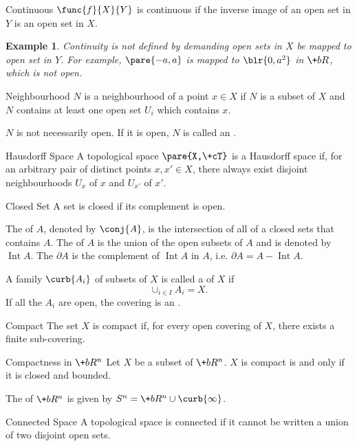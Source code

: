 \documentclass[hidelinks]{article}
\newtheorem{example}{Example}
\DeclareMathOperator{\Int}{Int}
\begin{document}
\begin{termdef}{Continuous}
    $\func{f}{X}{Y}$ is continuous if the inverse image of an open set in $Y$ is an open set in $X$.
\end{termdef}
\begin{sample}
    \begin{example}
        Continuity is not defined by demanding open sets in $X$ be mapped to open set in $Y$. For example, $\pare{-a,a}$ is mapped to $\blr{0,a^2}$ in $\+bR$, which is not open.
    \end{example}
\end{sample}
\begin{termdef}{Neighbourhood}
    $N$ is a neighbourhood of a point $x\in X$ if $N$ is a subset of $X$ and $N$ contains at least one open set $U_i$ which contains $x$.
\end{termdef}
$N$ is not necessarily open. If it is open, $N$ is called an .
\begin{termdef}{Hausdorff Space}
    A topological space $\pare{X,\+cT}$ is a Hausdorff space if, for an arbitrary pair of distinct points $x,x' \in X$, there always exist disjoint neighbourhoods $U_x$ of $x$ and $U_{x'}$ of $x'$.
\end{termdef}
\begin{termdef}{Closed Set}
    A set is closed if its complement is open.
\end{termdef}
The  of $A$, denoted by $\conj{A}$, is the intersection of all of a closed sets that contains $A$. The  of $A$ is the union of the open subsets of $A$ and is denoted by $\Int A$. The  $\partial A$ is the complement of $\Int A$ in $A$, i.e. $\partial A = A - \Int A$.
\par
A family $\curb{A_i}$ of subsets of $X$ is called a  of $X$ if
\[ \cup_{i\in I} A_i = X. \]
If all the $A_i$ are open, the covering is an .
\begin{termdef}{Compact}
    The set $X$ is compact if, for every open covering of $X$, there exists a finite sub-covering.
\end{termdef}
\begin{finaleq}{Compactness in $\+bR^n$}
    Let $X$ be a subset of $\+bR^n$. $X$ is compact is and only if it is closed and bounded.
\end{finaleq}
The  of $\+bR^n$ is given by $S^n = \+bR^n \cup \curb{\infty}$.
\begin{termdef}{Connected Space}
    A topological space is connected if it cannot be written a union of two disjoint open sets.
\end{termdef}
\end{document}
